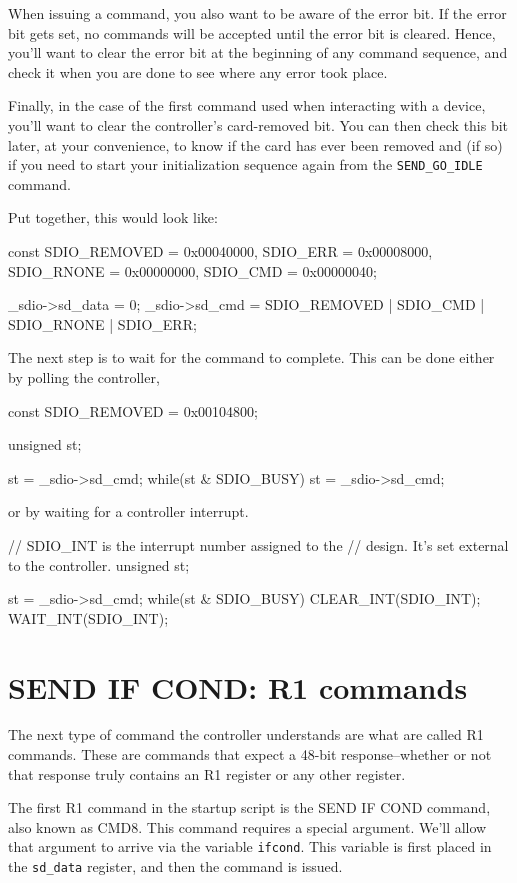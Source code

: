 \documentclass{gqtekspec}
\begin{document}
When issuing a command, you also want to be aware of the error bit.  If the
error bit gets set, no commands will be accepted until the error bit is cleared.
Hence, you'll want to clear the error bit at the beginning of any command
sequence, and check it when you are done to see where any error took place.

Finally, in the case of the first command used when interacting with a device,
you'll want to clear the controller's card-removed bit.  You can then check
this bit later, at your convenience, to know if the card has ever been removed
and (if so) if you need to start your initialization sequence again from
the {\tt SEND\_GO\_IDLE} command.

Put together, this would look like:
\begin{CPP}
	const	SDIO_REMOVED = 0x00040000,
		SDIO_ERR     = 0x00008000,
		SDIO_RNONE   = 0x00000000,
		SDIO_CMD     = 0x00000040;

	_sdio->sd_data = 0;
	_sdio->sd_cmd  = SDIO_REMOVED | SDIO_CMD | SDIO_RNONE | SDIO_ERR;
\end{CPP}

The next step is to wait for the command to complete.  This can be done either
by polling the controller,
\begin{CPP}
	const	SDIO_REMOVED = 0x00104800;

	unsigned	st;

	st = _sdio->sd_cmd;
	while(st & SDIO_BUSY)
		st = _sdio->sd_cmd;
\end{CPP}
or by waiting for a controller interrupt.
\begin{CPP}
	// SDIO_INT is the interrupt number assigned to the
	// design.  It's set external to the controller.
	unsigned	st;

	st = _sdio->sd_cmd;
	while(st & SDIO_BUSY) {
		CLEAR_INT(SDIO_INT);
		WAIT_INT(SDIO_INT);
	}
\end{CPP}

\section{SEND IF COND: R1 commands}
The next type of command the controller understands are what are called
R1 commands.  These are commands that expect a 48-bit response--whether
or not that response truly contains an R1 register or any other register.

The first R1 command in the startup script is the SEND IF COND command, also
known as CMD8.  This command requires a special argument.  We'll allow that
argument to arrive via the variable {\tt ifcond}.  This variable is first
placed in the {\tt sd\_data} register, and then the command is issued.
\end{document}
